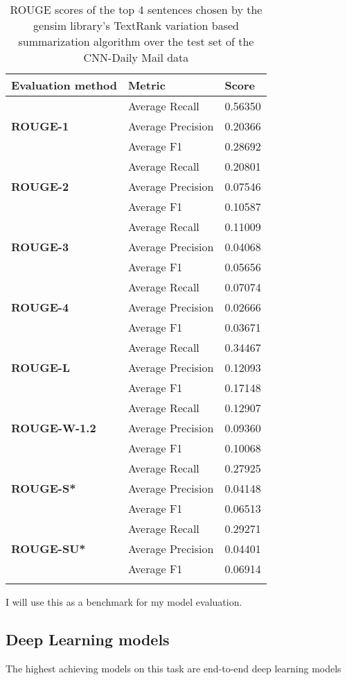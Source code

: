 \begin{longtable}{| l | l | l |}
	\hline
	\textbf{Evaluation method}&\textbf{Metric}&\textbf{Score}\\ \hline \hline
	\multirow{3}{*}{\textbf{ROUGE-1}}
		&Average Recall&0.56350 \\
		&Average Precision&0.20366  \\
		&Average F1&0.28692  \\ \hline \hline
	\multirow{3}{*}{\textbf{ROUGE-2}}
		&Average Recall&0.20801 \\
		&Average Precision&0.07546 \\
		&Average F1&0.10587 \\ \hline \hline
	\multirow{3}{*}{\textbf{ROUGE-3}}
		&Average Recall&0.11009 \\
		&Average Precision&0.04068 \\
		&Average F1&0.05656 \\ \hline \hline
	\multirow{3}{*}{\textbf{ROUGE-4}}
		&Average Recall&0.07074 \\
		&Average Precision&0.02666 \\
		&Average F1&0.03671 \\ \hline \hline
	\multirow{3}{*}{\textbf{ROUGE-L}}
		&Average Recall&0.34467 \\
		&Average Precision&0.12093 \\
		&Average F1&0.17148 \\ \hline \hline
	\multirow{3}{*}{\textbf{ROUGE-W-1.2}}
		&Average Recall&0.12907 \\
		&Average Precision&0.09360 \\
		&Average F1&0.10068 \\ \hline \hline
	\multirow{3}{*}{\textbf{ROUGE-S*}}
		&Average Recall&0.27925 \\
		&Average Precision&0.04148 \\
		&Average F1&0.06513 \\ \hline \hline
	\multirow{3}{*}{\textbf{ROUGE-SU*}}
		&Average Recall&0.29271 \\
		&Average Precision&0.04401 \\
		&Average F1&0.06914 \\ \hline
	\caption{ROUGE scores of the top 4 sentences chosen by the gensim library's TextRank variation based summarization algorithm over the test set of the CNN-Daily Mail data}
\end{longtable}

I will use this as a benchmark for my model evaluation.

\subsection{Deep Learning models}

The highest achieving models on this task are end-to-end deep learning models